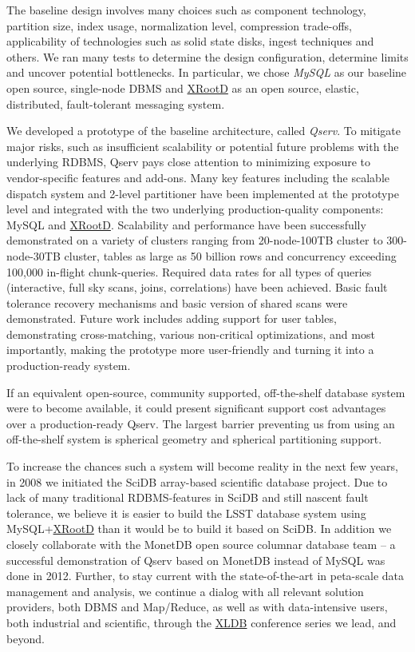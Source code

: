 \documentclass[DM,lsstdraft,toc]{lsstdoc}
\begin{document}
The baseline design involves many choices such as component technology,
partition size, index usage, normalization level, compression
trade-offs, applicability of technologies such as solid state disks,
ingest techniques and others. We ran many tests to determine the design
configuration, determine limits and uncover potential bottlenecks. In
particular, we chose \emph{MySQL} as our baseline open source,
single-node DBMS and \href{http://xrootd.org}{XRootD} as an open source,
elastic, distributed, fault-tolerant messaging system.

We developed a prototype of the baseline architecture, called
\emph{Qserv}. To mitigate major risks, such as insufficient scalability
or potential future problems with the underlying RDBMS, Qserv pays close
attention to minimizing exposure to vendor-specific features and
add-ons. Many key features including the scalable dispatch system and
2-level partitioner have been implemented at the prototype level and
integrated with the two underlying production-quality components: MySQL
and \href{http://xrootd.org}{XRootD}. Scalability and performance have
been successfully demonstrated on a variety of clusters ranging from
20-node-100TB cluster to 300-node-30TB cluster, tables as large as 50
billion rows and concurrency exceeding 100,000 in-flight chunk-queries.
Required data rates for all types of queries (interactive, full sky
scans, joins, correlations) have been achieved. Basic fault tolerance
recovery mechanisms and basic version of shared scans were demonstrated.
Future work includes adding support for user tables, demonstrating
cross-matching, various non-critical optimizations, and most
importantly, making the prototype more user-friendly and turning it into
a production-ready system.

If an equivalent open-source, community supported, off-the-shelf
database system were to become available, it could present significant
support cost advantages over a production-ready Qserv. The largest
barrier preventing us from using an off-the-shelf system is spherical
geometry and spherical partitioning support.

To increase the chances such a system will become reality in the next
few years, in 2008 we initiated the SciDB array-based scientific
database project. Due to lack of many traditional RDBMS-features in
SciDB and still nascent fault tolerance, we believe it is easier to
build the LSST database system using
MySQL+\href{http://xrootd.org}{XRootD} than it would be to build it
based on SciDB. In addition we closely collaborate with the MonetDB open
source columnar database team -- a successful demonstration of Qserv
based on MonetDB instead of MySQL was done in 2012. Further, to stay
current with the state-of-the-art in peta-scale data management and
analysis, we continue a dialog with all relevant solution providers,
both DBMS and Map/Reduce, as well as with data-intensive users, both
industrial and scientific, through the \href{http://xldb.org}{XLDB}
conference series we lead, and beyond.
\end{document}
